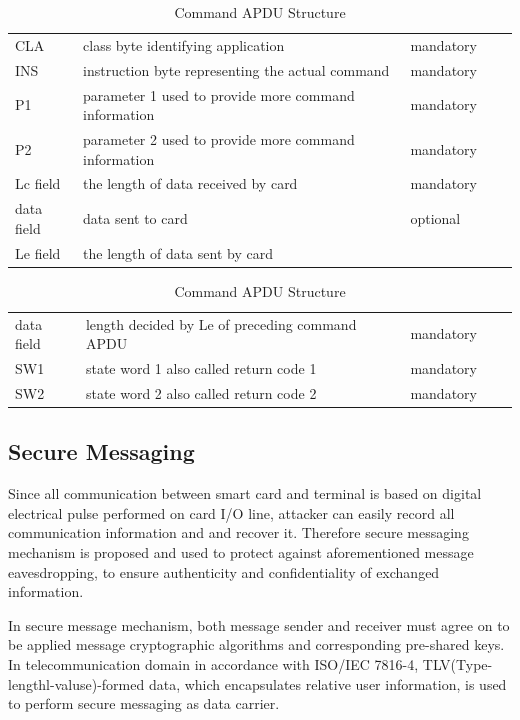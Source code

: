 \begin{table}[!htbp]
\caption{Command APDU Structure}
\centering
\begin{tabular}{lllll}
\hline\hline
 CLA &class byte identifying application  & mandatory \\[0.5ex]
 INS &instruction byte representing the actual command  & mandatory \\
 P1 &parameter 1 used to provide more command information & mandatory \\
 P2 &parameter 2 used to provide more command information& mandatory \\
 Lc field &the length of data received by card & mandatory \\
 data field &data sent to card& optional \\
Le field &the length of data sent by card \\
\hline
\end{tabular}
\label{table:capdu}
\end{table}

\begin{table}[ht]
\caption{Command APDU Structure}
\centering
\begin{tabular}{lllll}
\hline\hline
 data field & length decided by Le of preceding command  APDU  & mandatory \\[0.5ex]
 SW1 &state word 1 also called return code 1  & mandatory \\
 SW2 &state word 2 also called return code 2& mandatory \\
\hline
\end{tabular}
\label{table:rapdu}
\end{table}

\subsection{Secure Messaging}
Since all communication between smart card and terminal is based on digital electrical pulse performed on card I/O line, attacker can easily record all communication information and and recover it. Therefore secure messaging mechanism is proposed and used to protect against aforementioned message eavesdropping, to ensure authenticity and confidentiality of exchanged information.

In secure message mechanism, both message sender and receiver must agree on to be applied message cryptographic algorithms and corresponding pre-shared keys. In telecommunication domain in accordance with ISO/IEC 7816-4\cite{handbuch}, TLV(Type-lengthl-valuse)-formed data, which encapsulates relative user information, is used to perform secure messaging as data carrier.

